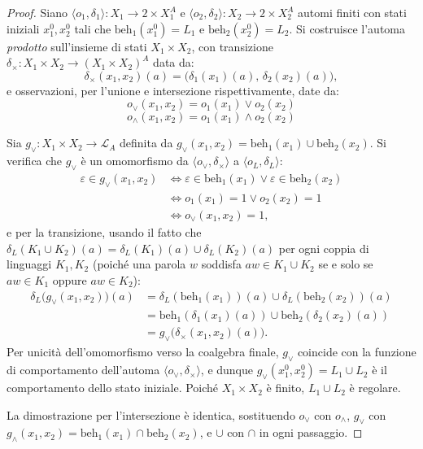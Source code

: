\begin{proof}
  Siano \(\langle o_1, \delta_1 \rangle : X_1 \to 2 \times X_1^A\) e \(\langle o_2, \delta_2 \rangle : X_2 \to 2 \times X_2^A\) automi finiti con stati iniziali \(x_1^0, x_2^0\) tali che \(\mathrm{beh}_1(x_1^0) = L_1\) e \(\mathrm{beh}_2(x_2^0) = L_2\). Si costruisce l'automa \textit{prodotto} sull'insieme di stati \(X_1 \times X_2\), con transizione \(\delta_\times : X_1 \times X_2 \to (X_1 \times X_2)^A\) data da:
  \[
    \delta_\times(x_1, x_2)(a) = \bigl(\delta_1(x_1)(a),\, \delta_2(x_2)(a)\bigr),
  \]
  e osservazioni, per l'unione e intersezione rispettivamente, date da:
  \[o_\vee(x_1, x_2) = o_1(x_1) \vee o_2(x_2)\]
  \[o_\wedge(x_1, x_2) = o_1(x_1) \wedge o_2(x_2)\]

  Sia \(g_\vee : X_1 \times X_2 \to \mathcal{L}_A\) definita da \(g_\vee(x_1, x_2) = \mathrm{beh}_1(x_1) \cup \mathrm{beh}_2(x_2)\). Si verifica che \(g_\vee\) è un omomorfismo da \(\langle o_\vee, \delta_\times \rangle\) a \(\langle o_L, \delta_L \rangle\):
  \[
    \begin{aligned}
      \varepsilon \in g_\vee(x_1, x_2) & \iff \varepsilon \in \mathrm{beh}_1(x_1) \vee \varepsilon \in \mathrm{beh}_2(x_2) \\
                                       & \iff o_1(x_1) = 1 \vee o_2(x_2) = 1                                               \\
                                       & \iff o_\vee(x_1, x_2) = 1,
    \end{aligned}
  \]
  e per la transizione, usando il fatto che \(\delta_L(K_1 \cup K_2)(a) = \delta_L(K_1)(a) \cup \delta_L(K_2)(a)\) per ogni coppia di linguaggi \(K_1, K_2\) (poiché una parola \(w\) soddisfa \(aw \in K_1 \cup K_2\) se e solo se \(aw \in K_1\) oppure \(aw \in K_2\)):
  \[
    \begin{aligned}
      \delta_L\bigl(g_\vee(x_1, x_2)\bigr)(a) & = \delta_L(\mathrm{beh}_1(x_1))(a) \cup \delta_L(\mathrm{beh}_2(x_2))(a) \\ &= \mathrm{beh}_1(\delta_1(x_1)(a)) \cup \mathrm{beh}_2(\delta_2(x_2)(a)) \\ &= g_\vee\bigl(\delta_\times(x_1, x_2)(a)\bigr).
    \end{aligned}
  \]
  Per unicità dell'omomorfismo verso la coalgebra finale, \(g_\vee\) coincide con la funzione di comportamento dell'automa \(\langle o_\vee, \delta_\times \rangle\), e dunque \(g_\vee(x_1^0, x_2^0) = L_1 \cup L_2\) è il comportamento dello stato iniziale. Poiché \(X_1 \times X_2\) è finito, \(L_1 \cup L_2\) è regolare.

  La dimostrazione per l'intersezione è identica, sostituendo \(o_\vee\) con \(o_\wedge\), \(g_\vee\) con \(g_\wedge(x_1,x_2) = \mathrm{beh}_1(x_1) \cap \mathrm{beh}_2(x_2)\), e \(\cup\) con \(\cap\) in ogni passaggio.
\end{proof}

